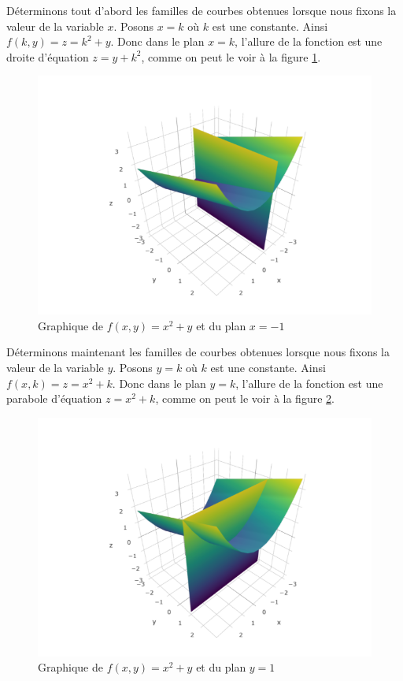 \documentclass[]{book}
\theoremstyle{definition}
\theoremstyle{definition}
\theoremstyle{definition}
\theoremstyle{remark}
\begin{document}
Déterminons tout d'abord les familles de courbes obtenues lorsque nous
fixons la valeur de la variable \(x\). Posons \(x=k\) où \(k\) est une
constante. Ainsi \(f(k,y)=z=k^2+y\). Donc dans le plan \(x=k\), l'allure
de la fonction est une droite d'équation \(z=y+k^2\), comme on peut le
voir à la figure \ref{fig:fctcoupe1}.

\begin{figure}

{\centering \includegraphics[width=0.8\linewidth]{resources/images/fct_coupe_plan1} 

}

\caption{Graphique de $f(x,y)=x^2+y$ et du plan $x=-1$}\label{fig:fctcoupe1}
\end{figure}

Déterminons maintenant les familles de courbes obtenues lorsque nous
fixons la valeur de la variable \(y\). Posons \(y=k\) où \(k\) est une
constante. Ainsi \(f(x,k)=z=x^2+k\). Donc dans le plan \(y=k\), l'allure
de la fonction est une parabole d'équation \(z=x^2+k\), comme on peut le
voir à la figure \ref{fig:fctcoupe2}.

\begin{figure}

{\centering \includegraphics[width=0.8\linewidth]{resources/images/fct_coupe_plan2} 

}

\caption{Graphique de $f(x,y)=x^2+y$ et du plan $y=1$}\label{fig:fctcoupe2}
\end{figure}
\end{document}
